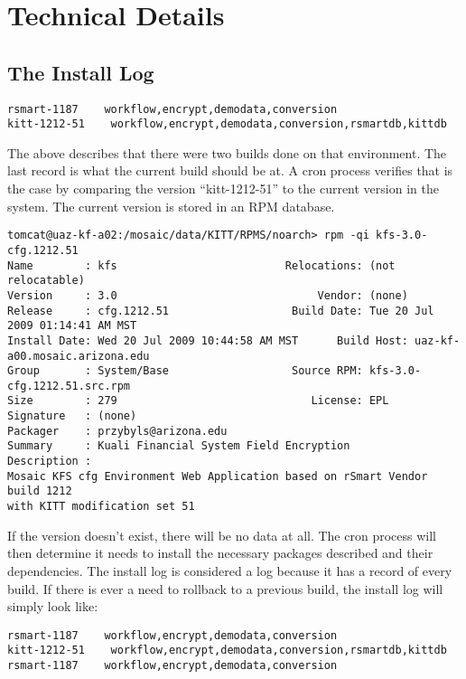 \documentclass[12pt,notitlepage]{article}
\begin{document}
\section{Technical Details}
\subsection{The Install Log}
\begin{lstlisting}[caption=An example of the install log]
rsmart-1187    workflow,encrypt,demodata,conversion
kitt-1212-51    workflow,encrypt,demodata,conversion,rsmartdb,kittdb
\end{lstlisting}

The above describes that there were two builds done on that environment. The last record is
what the current build should be at. A cron process verifies that is the case by comparing the version
``kitt-1212-51'' to the current version in the system. The current version is stored in an
RPM database.

\lstset{basicstyle=\tiny,
  breaklines=true,
  includerangemarker=false}
\begin{lstlisting}
tomcat@uaz-kf-a02:/mosaic/data/KITT/RPMS/noarch> rpm -qi kfs-3.0-cfg.1212.51
Name        : kfs                          Relocations: (not relocatable)
Version     : 3.0                               Vendor: (none)
Release     : cfg.1212.51                   Build Date: Tue 20 Jul 2009 01:14:41 AM MST
Install Date: Wed 20 Jul 2009 10:44:58 AM MST      Build Host: uaz-kf-a00.mosaic.arizona.edu
Group       : System/Base                   Source RPM: kfs-3.0-cfg.1212.51.src.rpm
Size        : 279                              License: EPL
Signature   : (none)
Packager    : przybyls@arizona.edu
Summary     : Kuali Financial System Field Encryption
Description :
Mosaic KFS cfg Environment Web Application based on rSmart Vendor build 1212
with KITT modification set 51
\end{lstlisting}
\lstset{basicstyle=\small,
  breaklines=true,
  includerangemarker=false}

If the version doesn't exist, there will be no data at all. The cron process will then determine it needs
to install the necessary packages described and their dependencies. The install log is considered a log because
it has a record of every build. If there is ever a need to rollback to a previous build, the install log 
will simply look like:

\begin{lstlisting}[caption=Rollback scenario]
rsmart-1187    workflow,encrypt,demodata,conversion
kitt-1212-51    workflow,encrypt,demodata,conversion,rsmartdb,kittdb
rsmart-1187    workflow,encrypt,demodata,conversion
\end{lstlisting}
\end{document}
